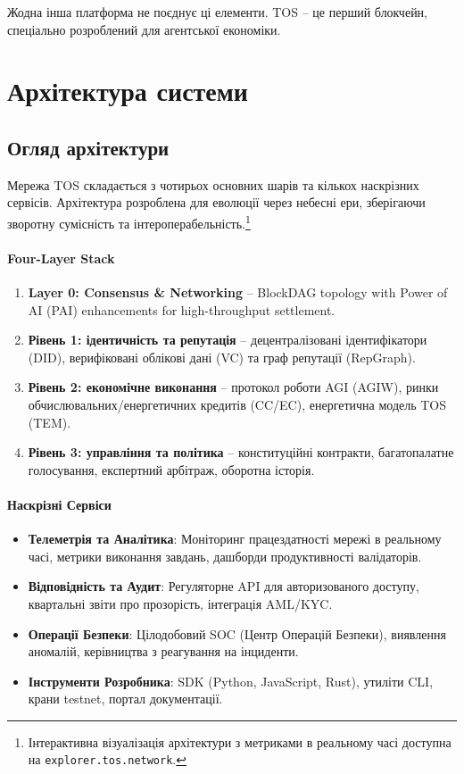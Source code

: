 \documentclass[11pt]{article}
\begin{document}
Жодна інша платформа не поєднує ці елементи. TOS -- це перший блокчейн, спеціально розроблений для агентської економіки.

\section{Архітектура системи}
\subsection{Огляд архітектури}
Мережа TOS складається з чотирьох основних шарів та кількох наскрізних сервісів. Архітектура розроблена для еволюції через небесні ери, зберігаючи зворотну сумісність та інтероперабельність.\footnote{Інтерактивна візуалізація архітектури з метриками в реальному часі доступна на \texttt{explorer.tos.network}.}

\paragraph{Four-Layer Stack}
\begin{enumerate}[noitemsep]
  \item \textbf{Layer 0: Consensus \& Networking} -- BlockDAG topology with Power of AI (PAI) enhancements for high-throughput settlement.
  \item \textbf{Рівень 1: ідентичність та репутація} -- децентралізовані ідентифікатори (DID), верифіковані облікові дані (VC) та граф репутації (RepGraph).
  \item \textbf{Рівень 2: економічне виконання} -- протокол роботи AGI (AGIW), ринки обчислювальних/енергетичних кредитів (CC/EC), енергетична модель TOS (TEM).
  \item \textbf{Рівень 3: управління та політика} -- конституційні контракти, багатопалатне голосування, експертний арбітраж, оборотна історія.
\end{enumerate}

\paragraph{Наскрізні Сервіси}
\begin{itemize}[noitemsep]
  \item \textbf{Телеметрія та Аналітика}: Моніторинг працездатності мережі в реальному часі, метрики виконання завдань, дашборди продуктивності валідаторів.
  \item \textbf{Відповідність та Аудит}: Регуляторне API для авторизованого доступу, квартальні звіти про прозорість, інтеграція AML/KYC.
  \item \textbf{Операції Безпеки}: Цілодобовий SOC (Центр Операцій Безпеки), виявлення аномалій, керівництва з реагування на інциденти.
  \item \textbf{Інструменти Розробника}: SDK (Python, JavaScript, Rust), утиліти CLI, крани testnet, портал документації.
\end{itemize}
\end{document}
